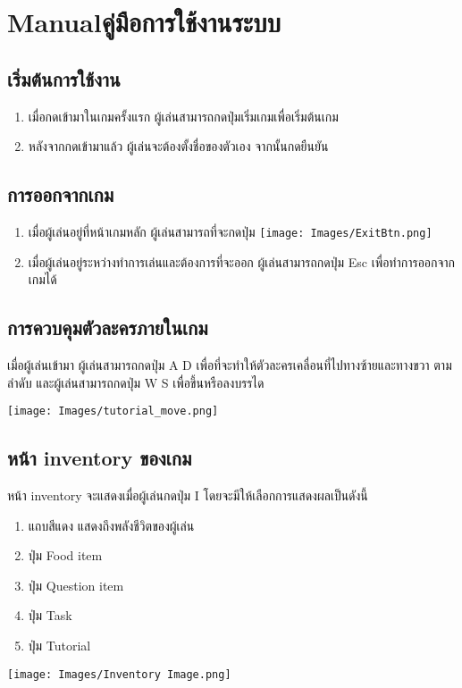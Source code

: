 
\chapter{\ifenglish Manual\else คู่มือการใช้งานระบบ\fi}

\section*{เริ่มต้นการใช้งาน}
\begin{enumerate}
    \item เมื่อกดเข้ามาในเกมครั้งแรก ผู้เล่นสามารถกดปุ่มเริ่มเกมเพื่อเริ่มต้นเกม
    \item หลังจากกดเข้ามาแล้ว ผู้เล่นจะต้องตั้งชื่อของตัวเอง จากนั้นกดยืนยัน
\end{enumerate}

\section*{การออกจากเกม}
\begin{enumerate}
    \item เมื่อผู้เล่นอยู่ที่หน้าเกมหลัก ผู้เล่นสามารถที่จะกดปุ่ม \texttt{[image: Images/ExitBtn.png]}
    \item เมื่อผู้เล่นอยู่ระหว่างทำการเล่นและต้องการที่จะออก ผู้เล่นสามารถกดปุ่ม Esc เพื่อทำการออกจากเกมได้
\end{enumerate}

\section*{การควบคุมตัวละครภายในเกม}
เมื่อผู้เล่นเข้ามา ผู้เล่นสามารถกดปุ่ม A D เพื่อที่จะทำให้ตัวละครเคลื่อนที่ไปทางซ้ายและทางขวา ตามลำดับ และผู้เล่นสามารถกดปุ่ม W S เพื่อขึ้นหรือลงบรรได
\begin{center}
    \texttt{[image: Images/tutorial\_move.png]}
\end{center}

\section*{หน้า inventory ของเกม}
หน้า inventory จะแสดงเมื่อผู้เล่นกดปุ่ม I โดยจะมีให้เลือกการแสดงผลเป็นดังนี้
    \begin{enumerate}
        \item แถบสีแดง แสดงถึงพลังชีวิตของผู้เล่น
        \item ปุ่ม Food item
        \item ปุ่ม Question item
        \item ปุ่ม Task
        \item ปุ่ม Tutorial
    \end{enumerate}
    \begin{center}
        \texttt{[image: Images/Inventory Image.png]}
    \end{center}
